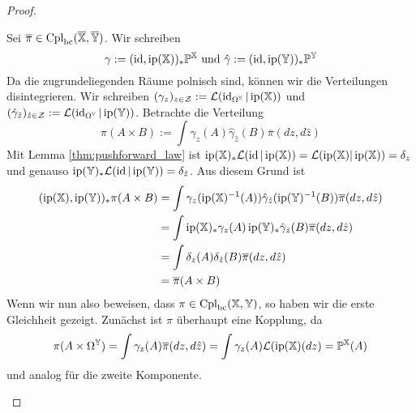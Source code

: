 \begin{proof}
\begin{enumerate}
Sei $\overline{\pi} \in \operatorname{Cpl}_{\operatorname{bc}}(\overline{\mathbb{X}}, \overline{\mathbb{Y}})$. Wir schreiben
$$\gamma := (\operatorname{id}, \operatorname{ip}(\mathbb{X}))_*\mathbb{P}^\mathbb{X} \text{ und } \hat{\gamma}:=(\operatorname{id}, \operatorname{ip}(\mathbb{Y}))_*\mathbb{P}^\mathbb{Y}$$
Da die zugrundeliegenden Räume polnisch sind, können wir die Verteilungen disintegrieren. Wir schreiben $(\gamma_z)_{z \in \mathcal{Z}}:=\mathcal{L}(\operatorname{id}_{\Omega^\mathbb{X}} \vert \operatorname{ip}(\mathbb{X}))$ und $(\hat{\gamma}_{\hat{z}})_{\hat{z} \in \mathcal{Z}}:=\mathcal{L}(\operatorname{id}_{\Omega^\mathbb{Y}} \vert \operatorname{ip}(\mathbb{Y}))$.
Betrachte die Verteilung 
$$\pi(A\times B) := \int \gamma_z(A) \hat{\gamma}_{\hat{z}}(B)\overline{\pi}(dz, d\hat{z})$$
Mit Lemma \ref{thm:pushforward_law} ist $\operatorname{ip}(\mathbb{X})_*\mathcal{L}(\operatorname{id} \vert \operatorname{ip}(\mathbb{X}))= \mathcal{L}(\operatorname{ip}(\mathbb{X}) \vert \operatorname{ip}(\mathbb{X}))= \delta_{z}$ und genauso $\operatorname{ip}(\mathbb{Y})_*\mathcal{L}(\operatorname{id} \vert \operatorname{ip}(\mathbb{Y})) = \delta_{\hat{z}}$. Aus diesem Grund ist
\begin{align*}
(\operatorname{ip}(\mathbb{X}), \operatorname{ip}(\mathbb{Y}))_*\pi(A \times B) &= \int \gamma_z(\operatorname{ip}(\mathbb{X})^{-1}(A)) \hat{\gamma}_{\hat{z}}(\operatorname{ip}(\mathbb{Y})^{-1}(B))\overline{\pi}(dz, d\hat{z}) \\
&= \int \operatorname{ip}(\mathbb{X})_*\gamma_z(A) \operatorname{ip}(\mathbb{Y})_*\hat{\gamma}_{\hat{z}}(B) \overline{\pi}(dz, d\hat{z}) \\
&= \int \delta_z(A) \delta_{\hat{z}}(B)\overline{\pi}(dz, d\hat{z}) \\
&= \overline{\pi}(A \times B)
\end{align*}
Wenn wir nun also beweisen, dass $\pi \in \operatorname{Cpl}_{\operatorname{bc}}(\mathbb{X}, \mathbb{Y})$, so haben wir die erste Gleichheit gezeigt. Zunächst ist $\pi$ überhaupt eine Kopplung,  da 
$$\pi(A\times \Omega^{\mathbb{Y}}) = \int \gamma_z(A) \overline{\pi}(dz, d\hat{z}) = \int \gamma_z(A) \mathcal{L}(\operatorname{ip}(\mathbb{X})(dz) = \mathbb{P}^\mathbb{X}(A)$$
und analog für die zweite Komponente.


\end{enumerate}
\end{proof}
